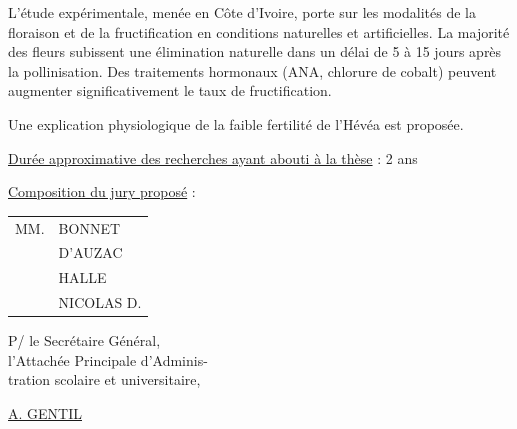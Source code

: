 L'étude expérimentale, menée en Côte d'Ivoire, porte sur les modalités de la floraison et de la fructification en conditions naturelles et artificielles. La majorité des fleurs subissent une élimination naturelle dans un délai de 5 à 15 jours après la pollinisation. Des traitements hormonaux (ANA, chlorure de cobalt) peuvent augmenter significativement le taux de fructification.

Une explication physiologique de la faible fertilité de l'Hévéa est proposée.

\uline{Durée approximative des recherches ayant abouti à la thèse} : 2 ans

\uline{Composition du jury proposé} : \begin{tabular}[t]{ll}
MM. & BONNET\\
& D'AUZAC\\
& HALLE\\
& NICOLAS D.
\end{tabular}

\begin{flushright}
P/ le Secrétaire Général,\\
l'Attachée Principale d'Adminis-\\
tration scolaire et universitaire,


\uline{A. GENTIL}
\end{flushright}

